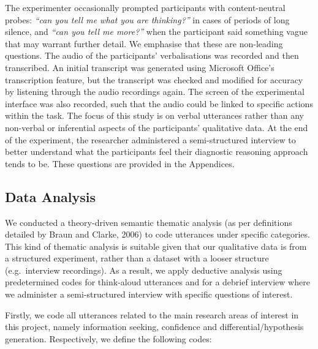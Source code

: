 \documentclass[a4paper, nobind]{templates/ociamthesis}
\begin{document}
The experimenter occasionally prompted participants with content-neutral probes: \emph{``can you tell me what you are thinking?''} in cases of periods of long silence, and \emph{``can you tell me more?''} when the participant said something vague that may warrant further detail. We emphasise that these are non-leading questions. The audio of the participants' verbalisations was recorded and then transcribed. An initial transcript was generated using Microsoft Office's transcription feature, but the transcript was checked and modified for accuracy by listening through the audio recordings again. The screen of the experimental interface was also recorded, such that the audio could be linked to specific actions within the task. The focus of this study is on verbal utterances rather than any non-verbal or inferential aspects of the participants' qualitative data. At the end of the experiment, the researcher administered a semi-structured interview to better understand what the participants feel their diagnostic reasoning approach tends to be. These questions are provided in the Appendices.

\subsection*{Data Analysis}\label{data-analysis-1}

We conducted a theory-driven semantic thematic analysis (as per definitions detailed by Braun and Clarke, 2006) to code utterances under specific categories. This kind of thematic analysis is suitable given that our qualitative data is from a structured experiment, rather than a dataset with a looser structure (e.g.~interview recordings). As a result, we apply deductive analysis using predetermined codes for think-aloud utterances and for a debrief interview where we administer a semi-structured interview with specific questions of interest.

Firstly, we code all utterances related to the main research areas of interest in this project, namely information seeking, confidence and differential/hypothesis generation. Respectively, we define the following codes:
\end{document}
